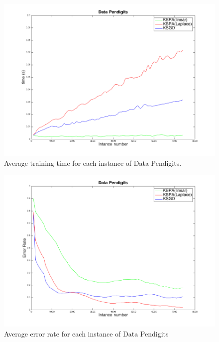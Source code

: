 \begin{figure}[h!]
\label{pic:PKT}
\centerline{
\includegraphics[scale = 0.4]{fig05/mc/Pendigits_kernel_T.png}
}
\caption{Average training time for each instance of Data Pendigits.}
\end{figure}

\begin{figure}[h!]
\label{pic:PKM}
\centerline{
\includegraphics[scale = 0.4]{fig05/mc/Pendigits_kernel_M.png}}
\caption{Average error rate for each instance of Data Pendigits}
\end{figure}

